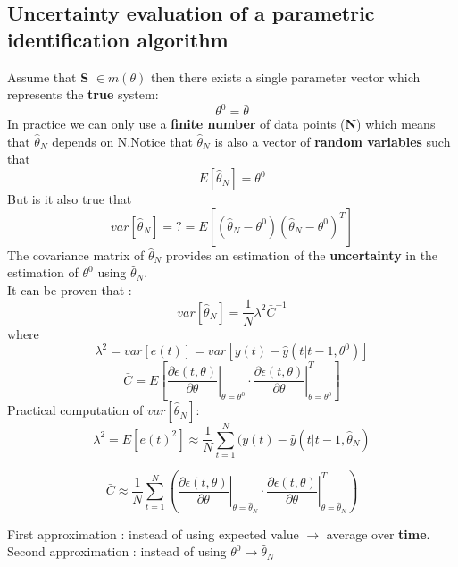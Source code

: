 \subsection{Uncertainty evaluation of a parametric identification algorithm}
Assume that \textbf{S} $\in m(\theta)$ then there exists a single parameter vector which represents the \textbf{true} system:$$ \theta^0 = \bar{\theta}$$
In practice we can only use a \textbf{finite number} of data points (\textbf{N}) which means that $\hat{\theta}_N$ depends on N.Notice that $\hat{\theta}_N$ is also a vector of  \textbf{random variables} such that $$ E[\hat{\theta}_N]=\theta^0$$
But is it also true that $$ var[\hat{\theta}_N]=?=E[(\hat{\theta}_N - \theta^0)(\hat{\theta}_N - \theta^0)^T]$$
The covariance matrix of $\hat{\theta}_N$ provides an estimation of the \textbf{uncertainty}  in the estimation of $\theta^0$ using $\hat{\theta}_N$.\\
It can be proven that :
\[
\boxed{var[\hat{\theta}_N] = \frac{1}{N}\lambda^2 \bar{C}^{-1}}
\]
where 
$$ \lambda^2 = var[e(t)]=var[y(t) - \hat{y}(t|t-1,\theta^0)]$$
$$ \bar{C}= E\left[ \left. \frac{\partial{\epsilon(t,\theta)}}{\partial{\theta}}\right|_{\theta=\theta^0} \cdot \left. \frac{\partial{\epsilon(t,\theta)}}{\partial{\theta}}\right|^{T}_{\theta=\theta^0} \right]$$
Practical computation of $var[\hat{\theta}_N]$:
$$ \lambda^2 = E[e(t)^2] \approx \frac{1}{N} \sum\limits_{t=1}^{N}(y(t) - \hat{y}(t|t-1,\hat{\theta}_N)$$

$$\bar{C} \approx \frac{1}{N}\sum\limits_{t=1}^{N}\left( \left. \frac{\partial{\epsilon(t,\theta)}}{\partial{\theta}}\right|_{\theta=\hat{\theta}_N} \cdot \left. \frac{\partial{\epsilon(t,\theta)}}{\partial{\theta}}\right|^{T}_{\theta=\hat{\theta}_N} \right)$$

First approximation : instead  of using expected value $\to$ average over \textbf{time}.\\
Second approximation : instead of using $\theta^0 \to \hat{\theta}_N$

